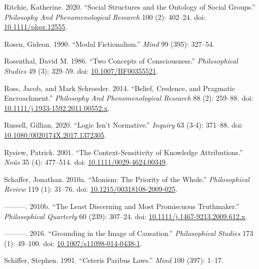 \documentclass[
  10pt,
  letterpaper,
  DIV=11,
  numbers=noendperiod,
  twoside]{scrartcl}
\newlength{\cslhangindent}
\newenvironment{CSLReferences}[2] %
 {\begin{list}{}{%
  \setlength{\itemindent}{0pt}
  \setlength{\leftmargin}{0pt}
  \setlength{\parsep}{0pt}
  \ifodd #1
   \setlength{\leftmargin}{\cslhangindent}
   \setlength{\itemindent}{-1\cslhangindent}
  \fi
  \setlength{\itemsep}{#2\baselineskip}}}
 {\end{list}}
\begin{document}
\begin{CSLReferences}{1}{0}
Ritchie, Katherine. 2020. {``Social Structures and the Ontology of
Social Groups.''} \emph{Philosophy And Phenomenological Research} 100
(2): 402--24. doi:
\href{https://doi.org/10.1111/phpr.12555}{10.1111/phpr.12555}.

Rosen, Gideon. 1990. {``Modal Fictionalism.''} \emph{Mind} 99 (395):
327--54.

Rosenthal, David M. 1986. {``Two Concepts of Consciousness.''}
\emph{Philosophical Studies} 49 (3): 329--59. doi:
\href{https://doi.org/10.1007/BF00355521}{10.1007/BF00355521}.

Ross, Jacob, and Mark Schroeder. 2014. {``Belief, Credence, and
Pragmatic Encroachment.''} \emph{Philosophy And Phenomenological
Research} 88 (2): 259--88. doi:
\href{https://doi.org/10.1111/j.1933-1592.2011.00552.x}{10.1111/j.1933-1592.2011.00552.x}.

Russell, Gillian. 2020. {``Logic Isn't Normative.''} \emph{Inquiry} 63
(3-4): 371--88. doi:
\href{https://doi.org/10.1080/0020174X.2017.1372305}{10.1080/0020174X.2017.1372305}.

Rysiew, Patrick. 2001. {``The Context-Sensitivity of Knowledge
Attributions.''} \emph{Noûs} 35 (4): 477--514. doi:
\href{https://doi.org/10.1111/0029-4624.00349}{10.1111/0029-4624.00349}.

Schaffer, Jonathan. 2010a. {``Monism: The Priority of the Whole.''}
\emph{Philosophical Review} 119 (1): 31--76. doi:
\href{https://doi.org/10.1215/00318108-2009-025}{10.1215/00318108-2009-025}.

---------. 2010b. {``The Least Discerning and Most Promiscuous
Truthmaker.''} \emph{Philosophical Quarterly} 60 (239): 307--24. doi:
\href{https://doi.org/10.1111/j.1467-9213.2009.612.x}{10.1111/j.1467-9213.2009.612.x}.

---------. 2016. {``Grounding in the Image of Causation.''}
\emph{Philosophical Studies} 173 (1): 49--100. doi:
\href{https://doi.org/10.1007/s11098-014-0438-1}{10.1007/s11098-014-0438-1}.

Schiffer, Stephen. 1991. {``Ceteris Paribus Laws.''} \emph{Mind} 100
(397): 1--17.


\end{CSLReferences}
\end{document}
